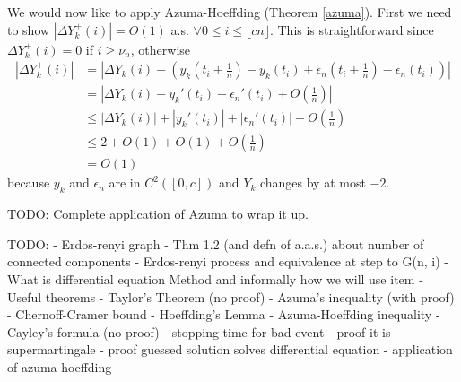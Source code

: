We would now like to apply Azuma-Hoeffding (Theorem \ref{azuma}). First we need to show \(|\Delta Y_{k}^{+}(i)| = O(1)\) a.s. \(\forall 0 \leq i \leq \lfloor {cn} \rfloor\). This is straightforward since \(\Delta Y_{k}^{+}(i) = 0\) if \(i \geq \nu_{n}\), otherwise 
\begin{align*}
    |\Delta Y_{k}^{+}(i)| &= |\Delta Y_{k}(i) - (y_{k}(t_{i} + \frac{1}{n}) - y_{k}(t_{i}) + \epsilon_{n}(t_{i} + \frac{1}{n}) - \epsilon_{n}(t_{i}))| \\
    &= |\Delta Y_{k}(i) - y_{k}'(t_{i}) - \epsilon_{n}'(t_{i}) + O(\frac{1}{n})| \\
    &\leq |\Delta Y_{k}(i)| + |y_{k}'(t_{i})| + |\epsilon_{n}'(t_{i})| + O(\frac{1}{n}) \\
    &\leq 2 + O(1) + O(1) + O(\frac{1}{n}) \\
    &= O(1)
\end{align*}
because \(y_{k}\) and \(\epsilon_{n}\) are in \(C^{2}([0, c])\) and \(Y_{k}\) changes by at most \(-2\).

TODO: Complete application of Azuma to wrap it up.



TODO:
- Erdos-renyi graph
- Thm 1.2 (and defn of a.a.s.) about number of connected components
- Erdos-renyi process and equivalence at step to G(n, i)
- What is differential equation Method and informally how we will use item
- Useful theorems
    - Taylor's Theorem (no proof)
    - Azuma's inequality (with proof)
        - Chernoff-Cramer bound
        - Hoeffding's Lemma
        - Azuma-Hoeffding inequality
    - Cayley's formula (no proof)
- stopping time for bad event
- proof it is supermartingale
- proof guessed solution solves differential equation
- application of azuma-hoeffding
